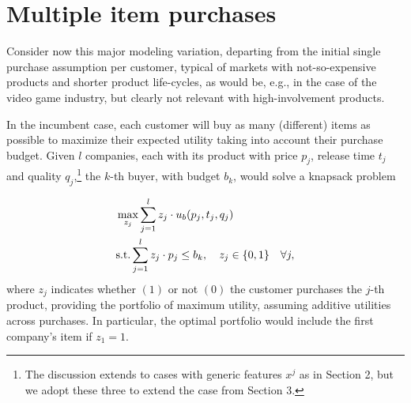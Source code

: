 \documentclass[a4paper,fleqn, 11pt]{cas-sc}
\begin{document}
\FloatBarrier
\section{Multiple item purchases}

Consider now this major modeling variation, departing from the initial 
 single purchase assumption per customer, typical of  
  markets with not-so-expensive products and shorter product 
 life-cycles, as would be, e.g., in the case of the video game industry, but clearly not relevant with high-involvement 
 products.
 
 In the incumbent case, each customer will buy as many (different) items as possible to maximize their expected utility taking into account their purchase budget. Given $l$ companies, each with its product with price $p_j$, release time $t_j$ and quality $q_j$,\footnote{The discussion extends
 to cases with generic features $x^j$   as in Section 2, but we adopt these three to extend the case from Section 3.}
  the $k$-th buyer, with budget $b_k$, would solve 
  a knapsack problem~\citep{cacchiani2022knapsack2,cacchiani2022knapsack}

\begin{equation}
\begin{aligned}
    & \max_{z_j} \sum_{j=1}^l z_j \cdot u_b(p_j, t_j, q_j) \\
    & {\rm s.t.} \sum_{j=1}^l z_j \cdot p_j \leq b_k, \quad z_j \in \{0, 1\} \quad \forall j,
\end{aligned}
\label{knapsack_eq}
\end{equation}
where $z_j$ indicates whether $(1)$ or not $(0)$ the customer purchases the $j$-th product, providing the portfolio of maximum utility, assuming additive utilities across purchases. 
In particular, the optimal portfolio would include the first company's item if $z_1=1$. %
\end{document}
